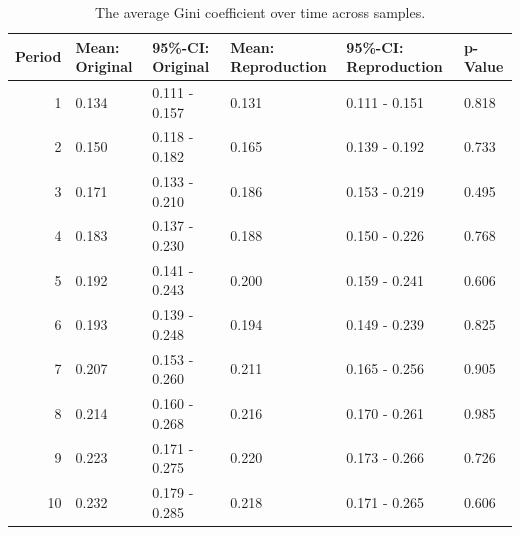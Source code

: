 \documentclass[
  authoryear,
  review,
  3p,
  onecolumn]{elsarticle}
\begin{document}
\hypertarget{tbl-gini-periods}{}
\begin{table}
\caption{\label{tbl-gini-periods}The average Gini coefficient over time across samples. }\tabularnewline

\centering
\begin{tabular}{r|l|l|l|l|l}
\hline
Period & Mean: Original & 95\%-CI: Original & Mean: Reproduction & 95\%-CI: Reproduction & p-Value\\
\hline
1 & 0.134 & 0.111 - 0.157 & 0.131 & 0.111 - 0.151 & 0.818\\
\hline
2 & 0.150 & 0.118 - 0.182 & 0.165 & 0.139 - 0.192 & 0.733\\
\hline
3 & 0.171 & 0.133 - 0.210 & 0.186 & 0.153 - 0.219 & 0.495\\
\hline
4 & 0.183 & 0.137 - 0.230 & 0.188 & 0.150 - 0.226 & 0.768\\
\hline
5 & 0.192 & 0.141 - 0.243 & 0.200 & 0.159 - 0.241 & 0.606\\
\hline
6 & 0.193 & 0.139 - 0.248 & 0.194 & 0.149 - 0.239 & 0.825\\
\hline
7 & 0.207 & 0.153 - 0.260 & 0.211 & 0.165 - 0.256 & 0.905\\
\hline
8 & 0.214 & 0.160 - 0.268 & 0.216 & 0.170 - 0.261 & 0.985\\
\hline
9 & 0.223 & 0.171 - 0.275 & 0.220 & 0.173 - 0.266 & 0.726\\
\hline
10 & 0.232 & 0.179 - 0.285 & 0.218 & 0.171 - 0.265 & 0.606\\
\hline
\end{tabular}
\end{table}

\newpage{}


  
\end{document}
